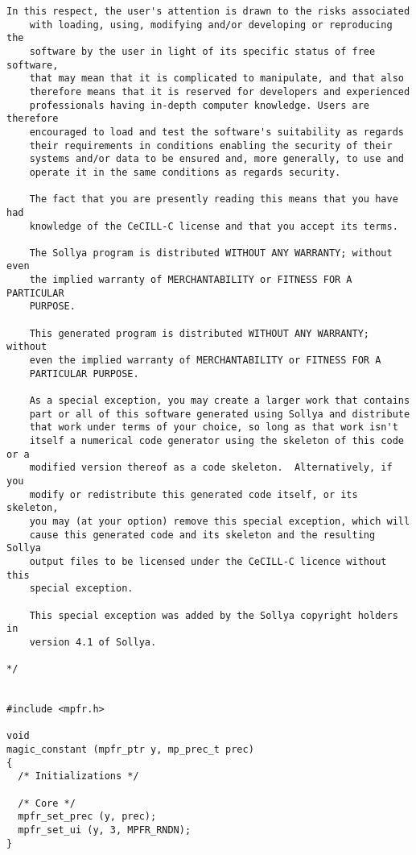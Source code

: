 \begin{center}
\begin{minipage}{15cm}
\begin{Verbatim}[frame=single]
    In this respect, the user's attention is drawn to the risks associated
    with loading, using, modifying and/or developing or reproducing the
    software by the user in light of its specific status of free software,
    that may mean that it is complicated to manipulate, and that also
    therefore means that it is reserved for developers and experienced
    professionals having in-depth computer knowledge. Users are therefore
    encouraged to load and test the software's suitability as regards
    their requirements in conditions enabling the security of their
    systems and/or data to be ensured and, more generally, to use and
    operate it in the same conditions as regards security.
    
    The fact that you are presently reading this means that you have had
    knowledge of the CeCILL-C license and that you accept its terms.
    
    The Sollya program is distributed WITHOUT ANY WARRANTY; without even
    the implied warranty of MERCHANTABILITY or FITNESS FOR A PARTICULAR
    PURPOSE.
    
    This generated program is distributed WITHOUT ANY WARRANTY; without
    even the implied warranty of MERCHANTABILITY or FITNESS FOR A
    PARTICULAR PURPOSE.
    
    As a special exception, you may create a larger work that contains
    part or all of this software generated using Sollya and distribute
    that work under terms of your choice, so long as that work isn't
    itself a numerical code generator using the skeleton of this code or a
    modified version thereof as a code skeleton.  Alternatively, if you
    modify or redistribute this generated code itself, or its skeleton,
    you may (at your option) remove this special exception, which will
    cause this generated code and its skeleton and the resulting Sollya
    output files to be licensed under the CeCILL-C licence without this
    special exception.
    
    This special exception was added by the Sollya copyright holders in
    version 4.1 of Sollya.
    
*/


#include <mpfr.h>

void
magic_constant (mpfr_ptr y, mp_prec_t prec)
{
  /* Initializations */

  /* Core */
  mpfr_set_prec (y, prec);
  mpfr_set_ui (y, 3, MPFR_RNDN);
}

\end{Verbatim}
\end{minipage}\end{center}
